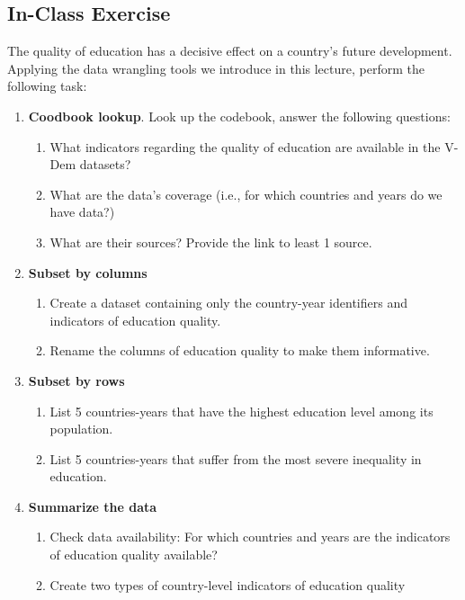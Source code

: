 \documentclass[
]{article}
\providecommand{\tightlist}{%
  \setlength{\itemsep}{0pt}\setlength{\parskip}{0pt}}
\begin{document}
\hypertarget{in-class-exercise}{%
\subsection{In-Class Exercise}\label{in-class-exercise}}

The quality of education has a decisive effect on a country's future
development. Applying the data wrangling tools we introduce in this
lecture, perform the following task:

\begin{enumerate}
\def\labelenumi{\arabic{enumi}.}
\tightlist
\item
  \textbf{Coodbook lookup}. Look up the codebook, answer the following
  questions:

  \begin{enumerate}
  \def\labelenumii{\arabic{enumii}.}
  \item
    What indicators regarding the quality of education are available in
    the V-Dem datasets?
  \item
    What are the data's coverage (i.e., for which countries and years do
    we have data?)
  \item
    What are their sources? Provide the link to least 1 source.
  \end{enumerate}
\item
  \textbf{Subset by columns}

  \begin{enumerate}
  \def\labelenumii{\arabic{enumii}.}
  \item
    Create a dataset containing only the country-year identifiers and
    indicators of education quality.
  \item
    Rename the columns of education quality to make them informative.
  \end{enumerate}
\item
  \textbf{Subset by rows}

  \begin{enumerate}
  \def\labelenumii{\arabic{enumii}.}
  \item
    List 5 countries-years that have the highest education level among
    its population.
  \item
    List 5 countries-years that suffer from the most severe inequality
    in education.
  \end{enumerate}
\item
  \textbf{Summarize the data}

  \begin{enumerate}
  \def\labelenumii{\arabic{enumii}.}
  \item
    Check data availability: For which countries and years are the
    indicators of education quality available?
  \item
    Create two types of country-level indicators of education quality


\end{enumerate}
\end{enumerate}
\end{document}
